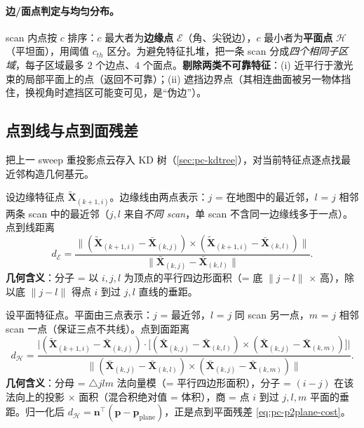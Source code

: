 \paragraph{边/面点判定与均匀分布。}
scan 内点按 $c$ 排序：$c$ 最大者为\textbf{边缘点} $\mathcal{E}$（角、尖锐边），$c$ 最小者为\textbf{平面点} $\mathcal{H}$（平坦面），用阈值 $c_{th}$ 区分。为避免特征扎堆，把一条 scan 分成\emph{四个相同子区域}，每子区域最多 $2$ 个边点、$4$ 个面点。\textbf{剔除两类不可靠特征}：(i) 近平行于激光束的局部平面上的点（返回不可靠）；(ii) 遮挡边界点（其相连曲面被另一物体挡住，换视角时遮挡区可能变可见，是“伪边”）。

\subsection{点到线与点到面残差}
\label{sec:pc-loam-res}

把上一 sweep 重投影点云存入 KD 树（\cref{sec:pc-kdtree}），对当前特征点逐点找最近邻构造几何基元。

\begin{derivation}[点到边缘线距离]
设边缘特征点 $\tilde{\mathbf{X}}_{(k+1,i)}$。边缘线由两点表示：$j$ = 在地图中的最近邻，$l$ = $j$ 相邻两条 scan 中的最近邻（$j,l$ 来自\emph{不同 scan}，单 scan 不含同一边缘线多于一点）。点到线距离
\begin{equation}
  d_{\mathcal{E}}=\frac{\big\|(\tilde{\mathbf{X}}_{(k+1,i)}-\bar{\mathbf{X}}_{(k,j)})\times(\tilde{\mathbf{X}}_{(k+1,i)}-\bar{\mathbf{X}}_{(k,l)})\big\|}{\big\|\bar{\mathbf{X}}_{(k,j)}-\bar{\mathbf{X}}_{(k,l)}\big\|}.
  \label{eq:pc-loam-dE}
\end{equation}
\textbf{几何含义}：分子 = 以 $i,j,l$ 为顶点的平行四边形面积（= 底 $\|j-l\|$ $\times$ 高），除以底 $\|j-l\|$ 得点 $i$ 到过 $j,l$ 直线的垂距。
\end{derivation}

\begin{derivation}[点到平面片距离]
设平面特征点。平面由三点表示：$j$ = 最近邻，$l$ = $j$ 同 scan 另一点，$m$ = $j$ 相邻 scan 一点（保证三点不共线）。点到面距离
\begin{equation}
  d_{\mathcal{H}}=\frac{\Big|(\tilde{\mathbf{X}}_{(k+1,i)}-\bar{\mathbf{X}}_{(k,j)})\cdot\big[(\bar{\mathbf{X}}_{(k,j)}-\bar{\mathbf{X}}_{(k,l)})\times(\bar{\mathbf{X}}_{(k,j)}-\bar{\mathbf{X}}_{(k,m)})\big]\Big|}{\big\|(\bar{\mathbf{X}}_{(k,j)}-\bar{\mathbf{X}}_{(k,l)})\times(\bar{\mathbf{X}}_{(k,j)}-\bar{\mathbf{X}}_{(k,m)})\big\|}.
  \label{eq:pc-loam-dH}
\end{equation}
\textbf{几何含义}：分母 = $\triangle jlm$ 法向量模（= 平行四边形面积），分子 = $(i-j)$ 在该法向上的投影 $\times$ 面积（混合积绝对值 = 体积），商 = 点 $i$ 到过 $j,l,m$ 平面的垂距。归一化后 $d_{\mathcal{H}}=\mathbf{n}^\top(\mathbf{p}-\mathbf{p}_{\text{plane}})$，正是点到平面残差 \cref{eq:pc-p2plane-cost}。
\end{derivation}

